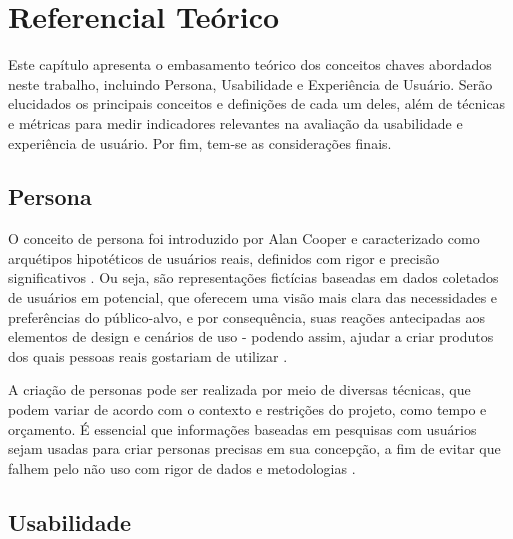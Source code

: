 \chapter[Referencial Teórico]{Referencial Teórico}

Este capítulo apresenta o embasamento teórico dos conceitos chaves abordados
neste trabalho, incluindo Persona, Usabilidade e Experiência de Usuário. Serão
elucidados os principais conceitos e definições de cada um deles, além de 
técnicas e métricas para medir indicadores relevantes na avaliação da 
usabilidade e experiência de usuário. Por fim, tem-se as considerações finais.

\section{Persona}
\label{sec:Persona}

O conceito de persona foi introduzido por Alan Cooper e caracterizado como 
arquétipos hipotéticos de usuários reais, definidos com rigor e precisão 
significativos \cite{cooper1999}. Ou seja, são representações fictícias 
baseadas em dados coletados de usuários em potencial, que oferecem uma visão 
mais clara das necessidades e preferências do público-alvo, e por consequência, 
suas reações antecipadas aos elementos de design e cenários de uso - podendo 
assim, ajudar a criar produtos dos quais pessoas reais gostariam de utilizar 
\cite{pruitt2006}.

A criação de personas pode ser realizada por meio de diversas técnicas, que 
podem variar de acordo com o contexto e restrições do projeto, como tempo e 
orçamento. É essencial que informações baseadas em pesquisas com usuários sejam 
usadas para criar personas precisas em sua concepção, a fim de evitar que falhem 
pelo não uso com rigor de dados e metodologias \cite{pruitt2006}.

\section{Usabilidade}
\label{sec:Usabilidade}

